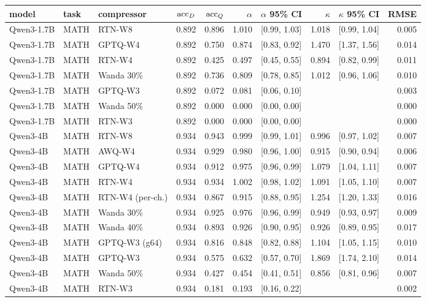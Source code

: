 \begin{tabular}{lllrrrlrlr}
\toprule
model & task & compressor & $\mathrm{acc}_D$ & $\mathrm{acc}_Q$ & $\alpha$ & $\alpha$ 95\% CI & $\kappa$ & $\kappa$ 95\% CI & RMSE \\
\midrule
Qwen3-1.7B & MATH & RTN-W8 & 0.892 & 0.896 & 1.010 & [0.99, 1.03] & 1.018 & [0.99, 1.04] & 0.005 \\
Qwen3-1.7B & MATH & GPTQ-W4 & 0.892 & 0.750 & 0.874 & [0.83, 0.92] & 1.470 & [1.37, 1.56] & 0.014 \\
Qwen3-1.7B & MATH & RTN-W4 & 0.892 & 0.425 & 0.497 & [0.45, 0.55] & 0.894 & [0.82, 0.99] & 0.011 \\
Qwen3-1.7B & MATH & Wanda 30\% & 0.892 & 0.736 & 0.809 & [0.78, 0.85] & 1.012 & [0.96, 1.06] & 0.010 \\
Qwen3-1.7B & MATH & GPTQ-W3 & 0.892 & 0.072 & 0.081 & [0.06, 0.10] &  &  & 0.003 \\
Qwen3-1.7B & MATH & Wanda 50\% & 0.892 & 0.000 & 0.000 & [0.00, 0.00] &  &  & 0.000 \\
Qwen3-1.7B & MATH & RTN-W3 & 0.892 & 0.000 & 0.000 & [0.00, 0.00] &  &  & 0.000 \\
Qwen3-4B & MATH & RTN-W8 & 0.934 & 0.943 & 0.999 & [0.99, 1.01] & 0.996 & [0.97, 1.02] & 0.007 \\
Qwen3-4B & MATH & AWQ-W4 & 0.934 & 0.929 & 0.980 & [0.96, 1.00] & 0.915 & [0.90, 0.94] & 0.006 \\
Qwen3-4B & MATH & GPTQ-W4 & 0.934 & 0.912 & 0.975 & [0.96, 0.99] & 1.079 & [1.04, 1.11] & 0.007 \\
Qwen3-4B & MATH & RTN-W4 & 0.934 & 0.934 & 1.002 & [0.98, 1.02] & 1.091 & [1.05, 1.10] & 0.007 \\
Qwen3-4B & MATH & RTN-W4 (per-ch.) & 0.934 & 0.867 & 0.915 & [0.88, 0.95] & 1.254 & [1.20, 1.33] & 0.016 \\
Qwen3-4B & MATH & Wanda 30\% & 0.934 & 0.925 & 0.976 & [0.96, 0.99] & 0.949 & [0.93, 0.97] & 0.009 \\
Qwen3-4B & MATH & Wanda 40\% & 0.934 & 0.893 & 0.926 & [0.90, 0.95] & 0.926 & [0.89, 0.95] & 0.017 \\
Qwen3-4B & MATH & GPTQ-W3 (g64) & 0.934 & 0.816 & 0.848 & [0.82, 0.88] & 1.104 & [1.05, 1.15] & 0.010 \\
Qwen3-4B & MATH & GPTQ-W3 & 0.934 & 0.575 & 0.632 & [0.57, 0.70] & 1.869 & [1.74, 2.10] & 0.014 \\
Qwen3-4B & MATH & Wanda 50\% & 0.934 & 0.427 & 0.454 & [0.41, 0.51] & 0.856 & [0.81, 0.96] & 0.007 \\
Qwen3-4B & MATH & RTN-W3 & 0.934 & 0.181 & 0.193 & [0.16, 0.22] &  &  & 0.002 \\

\end{tabular}

